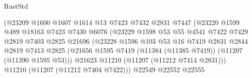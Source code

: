 \begin{lexlean}{RustStd}
\begin{coremodule}
                                      (@23209
                                        @1600
                                        @1607
                                        @1614
                                        @13
                                        @7423
                                        @7432
                                        @2831
                                        @7447
                                        (@23220
                                          @1599
                                          @489
                                          @18163
                                          @7423
                                          @7430
                                          @6076
                                          (@23229
                                            @1598
                                            @53
                                            @55
                                            @4541
                                            @7422
                                            @7429
                                            @2819
                                            @7403
                                            @2825
                                            @21696
                                            (@23228
                                              @1596
                                              @103
                                              @53
                                              @16
                                              @7419
                                              @2831
                                              @2844
                                              @2819
                                              @7413
                                              @2825
                                              (@21656
                                                @1595
                                                @7419
                                                (@11384 (@11385 @7419))
                                                (@11207 (@11390 @1595 @53)))
                                              @21623
                                              @11210
                                              (@11207 (@11212 @7414 @2831)))
                                            @11210
                                            (@11207 (@11212 @7404 @7422)))
                                          @22549
                                          @22552
                                          @22555

\end{coremodule}
\end{lexlean}
